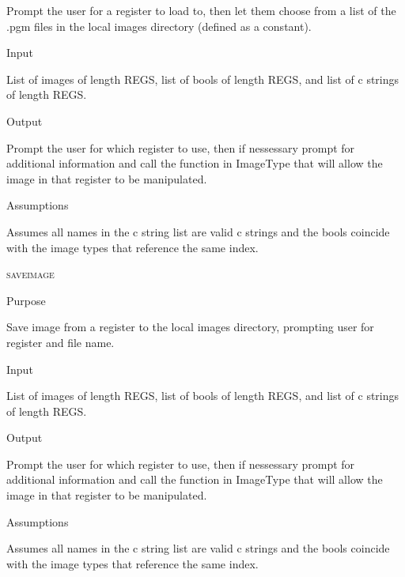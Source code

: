 \documentclass[pdftex, 11pt]{article}
\begin{document}
\begin{description}
\begin{description}
				Prompt the user for a register to load to, then let them choose from a list
				of the .pgm files in the local images directory (defined as a constant).

			\item{Input}

				List of images of length REGS, list of bools of length
				REGS, and list of c strings of length REGS.

			\item{Output}

				Prompt the user for which register to use, then if nessessary
				prompt for additional information and call the function
				in ImageType that will allow the image in that register to
				be manipulated.

			\item{Assumptions}

				Assumes all names in the c string list are valid c
				strings and the bools coincide with the image types that
				reference the same index.

		\end{description}



	\item{\textsc{saveimage}}
		\begin{description}
			\item{Purpose}

				Save image from a register to the local images directory, prompting user for
				register and file name.

			\item{Input}

				List of images of length REGS, list of bools of length
				REGS, and list of c strings of length REGS.

			\item{Output}

				Prompt the user for which register to use, then if nessessary
				prompt for additional information and call the function
				in ImageType that will allow the image in that register to
				be manipulated.

			\item{Assumptions}

				Assumes all names in the c string list are valid c
				strings and the bools coincide with the image types that
				reference the same index.

		\end{description}




\end{description}
\end{document}

